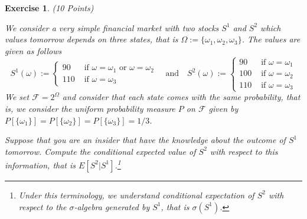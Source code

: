 \documentclass[DIV=classic,a4paper,10pt]{scrartcl}
\newtheorem{exercise}[theorem]{Exercise}
\theoremstyle{nonumberplain}
\numberwithin{equation}{section}
\begin{document}
\begin{exercise} (10 Points) 

    We consider a very simple financial market with two stocks $S^1$ and $S^2$ which values tomorrow depends on three states, that is $\Omega:=\{\omega_1,\omega_2,\omega_3\}$.
    The values are given as follows
    \begin{equation*}
        S^1(\omega):=
        \begin{cases}
            90  &\text{ if }\omega=\omega_1\text{ or }\omega=\omega_2\\
            110 &\text{ if }\omega =\omega_3
        \end{cases}
        \quad \text{and}\quad
        S^2(\omega):=
        \begin{cases}
            90  &\text{ if }\omega=\omega_1\\
            100 &\text{ if }\omega=\omega_2\\
            110 &\text{ if }\omega =\omega_3
        \end{cases}
    \end{equation*}
    We set $\mathcal{F}=2^\Omega$ and consider that each state comes with the same probability, that is, we consider the uniform probability measure $P$ on $\mathcal{F}$ given by $P[\{\omega_1\}]=P[\{\omega_2\}]=P[\{\omega_3\}]=1/3$.

    Suppose that you are an insider that have the knowledge about the outcome of $S^1$ tomorrow.
    Compute the conditional expected value of $S^2$ with respect to this information, that is $E[S^2|S^1]$.\footnote{Under this terminology, we understand conditional expectation of $S^2$ with respect to the $\sigma$-algebra generated by $S^1$, that is $\sigma(S^1)$.}
\end{exercise}
\end{document}

